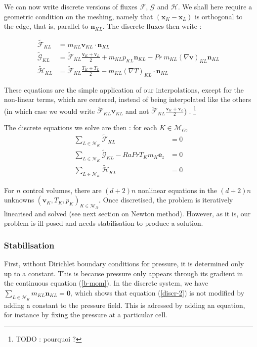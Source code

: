 \documentclass[12pt]{article}
\newcommand{\vb}[1]{\ensuremath{\boldsymbol #1}}
\begin{document}
We can now write discrete versions of fluxes $\mathcal F$, $\mathcal
G$ and $\mathcal H$. We shall here require a geometric condition on the
meshing, namely that  $(\vb{x}_{K} - \vb{x_{L}})$ is orthogonal to the
edge, that is, parallel to $\vb{n}_{KL}$. The discrete fluxes then write :

\begin{align}
  \tilde{\mathcal{F}}_{KL} &= m_{KL} \vb{v}_{KL} \cdot \vb{n}_{KL}\\
  \tilde{\mathcal{G}}_{KL} &= \tilde{\mathcal F}_{KL} \frac{\vb{v}_{K} + \vb{v}_{L}}{2}
  + m_{KL} p_{KL} \vb{n}_{KL}
  - Pr  \ m_{KL} (\nabla \vb{v})_{KL} \vb{n}_{KL}\\
  \tilde{\mathcal{H}}_{KL} &= \tilde{\mathcal F}_{KL} \frac{T_{K} + T_{L}} {2}
  - m_{KL} (\nabla T)_{KL} \cdot \vb{n}_{KL}
\end{align}

These equations are the simple application of our interpolations,
except for the non-linear terms, which are centered, instead of being
interpolated like the others (in which case we would write $\tilde{\mathcal
F}_{KL} \vb{v}_{KL}$ and not $\tilde{\mathcal F}_{KL} \frac{\vb{v}_{K} +
  \vb{v}_{L}}{2}$) . \footnote{TODO : pourquoi ?}

The discrete equations we solve are then : for each $K \in \mathcal
M_{\Omega}$, 
\begin{align}
  \label{discr-1}
  \sum_{L \in \mathcal{N}_K} \tilde{\mathcal{F}}_{KL} &= 0\\
  \label{discr-2}
  \sum_{L \in \mathcal{N}_K} \tilde{\mathcal{G}}_{KL} - Ra Pr T_{K}
  m_K \vb{e_{z}} &= 0\\
  \label{discr-3}
  \sum_{L \in \mathcal{N}_K} \tilde{\mathcal{H}}_{KL} &= 0
\end{align}

For $n$ control volumes, there are $(d+2)n$ nonlinear equations in the
$(d+2)n$ unknowns $(\vb{v}_{K}, T_{K}, p_{K})_{K \in \mathcal
  M_{\Omega}}$. Once discretised, the problem is iteratively linearised and solved
(see next section on Newton method). However, as it is, our problem is
ill-posed and needs stabilisation to produce a solution.

\subsubsection{Stabilisation}
First, without Dirichlet boundary conditions for pressure, it is
determined only up to a constant. This is because pressure only
appears through its gradient in the continuous equation
(\ref{b-mom}). In the discrete system, we have $\sum_{L \in
  \mathcal{N}_{K}} m_{KL} \vb{n}_{KL} = \vb{0}$, which shows that
equation (\ref{discr-2}) is not modified by adding a constant to the
pressure field. This is adressed by adding an equation, for instance
by fixing the pressure at a particular cell.
\end{document}
